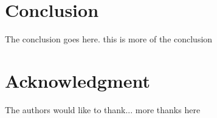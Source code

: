 \documentclass[10pt, conference, compsocconf]{IEEEtran}
\begin{document}
%





\section{Conclusion}
The conclusion goes here. this is more of the conclusion



\section*{Acknowledgment}


The authors would like to thank...
more thanks here


\end{document}

